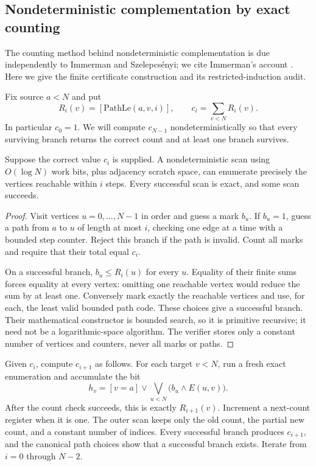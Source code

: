 \subsection{Nondeterministic complementation by exact counting}

The counting method behind nondeterministic complementation is due
independently to Immerman and Szelepcs\'enyi; we cite Immerman's account
\cite{Immerman1988}. Here we give the finite certificate construction and
its restricted-induction audit.

Fix source $a<N$ and put
\[
 R_i(v)=[\mathrm{PathLe}(a,v,i)],\qquad
 c_i=\sum_{v<N}R_i(v).
\]
In particular $c_0=1$. We will compute $c_{N-1}$ nondeterministically so
that every surviving branch returns the correct count and at least one
branch survives.

\begin{lemma}
Suppose the correct value $c_i$ is supplied. A nondeterministic scan using
$O(\log N)$ work bits, plus adjacency scratch space, can enumerate precisely
the vertices reachable within $i$ steps. Every successful scan is exact,
and some scan succeeds.
\end{lemma}
\begin{proof}
Visit vertices $u=0,\ldots,N-1$ in order and guess a mark $b_u$. If $b_u=1$,
guess a path from $a$ to $u$ of length at most $i$, checking one edge at a
time with a bounded step counter. Reject this branch if the path is invalid.
Count all marks and require that their total equal $c_i$.

On a successful branch, $b_u\leq R_i(u)$ for every $u$. Equality of their
finite sums forces equality at every vertex: omitting one reachable vertex
would reduce the sum by at least one. Conversely mark exactly the reachable
vertices and use, for each, the least valid bounded path code. These choices
give a successful branch. Their mathematical constructor is bounded search,
so it is primitive recursive; it need not be a logarithmic-space algorithm.
The verifier stores only a constant number of vertices and counters, never
all marks or paths.
\end{proof}

Given $c_i$, compute $c_{i+1}$ as follows. For each target $v<N$, run a fresh
exact enumeration and accumulate the bit
\[
 h_v=[v=a]\lor\bigvee_{u<N}\bigl(b_u\land E(u,v)\bigr).
\]
After the count check succeeds, this is exactly $R_{i+1}(v)$. Increment a
next-count register when it is one. The outer scan keeps only the old count,
the partial new count, and a constant number of indices. Every successful
branch produces $c_{i+1}$, and the canonical path choices show that a
successful branch exists. Iterate from $i=0$ through $N-2$.

